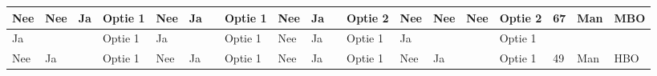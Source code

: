 \documentclass[twoside,openright]{uva-bachelor-thesis}
\begin{document}
\begin{table}
\begin{tabular}{|l|l|l|l|l|l|l|l|l|l|l|l|l|l|l|l|l|l|l|}
		Nee      & Nee      & Ja       & Optie 1                             & Nee      & Ja       &          & Optie 1                             & Nee      & Ja       &          & Optie 2                             & Nee      & Nee      & Nee      & Optie 2                             & 67                 & Man                &                             MBO                         \\  \hline
		Ja       &          &          & Optie 1                             & Ja       &          &          & Optie 1                             & Nee      & Ja       &          & Optie 1                             & Ja       &          &          & Optie 1                             &                    &                    &                                                        \\  \hline
		Nee      & Ja       &          & Optie 1                             & Nee      & Ja       &          & Optie 1                             & Nee      & Ja       &          & Optie 1                             & Nee      & Ja       &          & Optie 1                             & 49                 & Man                &                             HBO                          \\  \hline
	\end{tabular}
\end{table}
\end{document}
